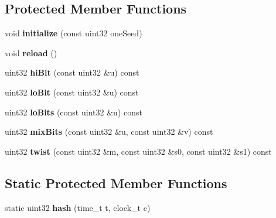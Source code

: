 \subsection*{Protected Member Functions}
\begin{DoxyCompactItemize}
\item 
\hypertarget{classelpm_1_1_m_t_rand_a5814bb06a304ae115c405ce118c2d87e}{void {\bfseries initialize} (const uint32 one\+Seed)}\label{classelpm_1_1_m_t_rand_a5814bb06a304ae115c405ce118c2d87e}

\item 
\hypertarget{classelpm_1_1_m_t_rand_ad399bdd0846c9a39b72900879a447c1e}{void {\bfseries reload} ()}\label{classelpm_1_1_m_t_rand_ad399bdd0846c9a39b72900879a447c1e}

\item 
\hypertarget{classelpm_1_1_m_t_rand_a6d801c0d5b1ac8167569492fffabac7d}{uint32 {\bfseries hi\+Bit} (const uint32 \&u) const }\label{classelpm_1_1_m_t_rand_a6d801c0d5b1ac8167569492fffabac7d}

\item 
\hypertarget{classelpm_1_1_m_t_rand_a87a5451f2013d5b4066a9c3b376e7641}{uint32 {\bfseries lo\+Bit} (const uint32 \&u) const }\label{classelpm_1_1_m_t_rand_a87a5451f2013d5b4066a9c3b376e7641}

\item 
\hypertarget{classelpm_1_1_m_t_rand_afdef501a74b8156d60934614d8524ece}{uint32 {\bfseries lo\+Bits} (const uint32 \&u) const }\label{classelpm_1_1_m_t_rand_afdef501a74b8156d60934614d8524ece}

\item 
\hypertarget{classelpm_1_1_m_t_rand_ad6ca8303d9696293c999d24f143cd7bd}{uint32 {\bfseries mix\+Bits} (const uint32 \&u, const uint32 \&v) const }\label{classelpm_1_1_m_t_rand_ad6ca8303d9696293c999d24f143cd7bd}

\item 
\hypertarget{classelpm_1_1_m_t_rand_ad7c2f9a9ea3c3065ab937a82445b0d3d}{uint32 {\bfseries twist} (const uint32 \&m, const uint32 \&s0, const uint32 \&s1) const }\label{classelpm_1_1_m_t_rand_ad7c2f9a9ea3c3065ab937a82445b0d3d}

\end{DoxyCompactItemize}
\subsection*{Static Protected Member Functions}
\begin{DoxyCompactItemize}
\item 
\hypertarget{classelpm_1_1_m_t_rand_af8335cbafa7a257869aad419412850e5}{static uint32 {\bfseries hash} (time\+\_\+t t, clock\+\_\+t c)}\label{classelpm_1_1_m_t_rand_af8335cbafa7a257869aad419412850e5}

\end{DoxyCompactItemize}
